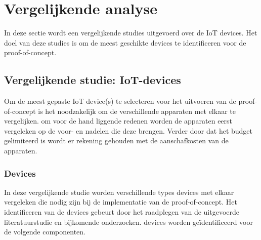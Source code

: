 \section{Vergelijkende analyse} \label{vergelijkendeanalyse}
In deze sectie wordt een vergelijkende studies uitgevoerd over de IoT devices. Het doel van deze studies is om de meest geschikte devices te identificeren voor de proof-of-concept.

\subsection{Vergelijkende studie: IoT-devices}
Om de meest gepaste IoT device(s) te selecteren voor het uitvoeren van de proof-of-concept is het noodzakelijk om de verschillende apparaten met elkaar te vergelijken. om voor de hand liggende redenen worden de apparaten eerst vergeleken op de voor- en nadelen die deze brengen. Verder door dat het budget gelimiteerd is wordt er rekening gehouden met de aanschafkosten van de apparaten.


\subsubsection{Devices}
In deze vergelijkende studie worden verschillende types devices met elkaar vergeleken die nodig zijn bij de implementatie van de proof-of-concept. Het identificeren van de devices gebeurt door het raadplegen van de uitgevoerde literatuurstudie en bijkomende onderzoeken. devices worden geïdentificeerd voor de volgende componenten.

